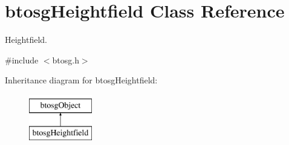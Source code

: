\hypertarget{classbtosgHeightfield}{}\section{btosg\+Heightfield Class Reference}
\label{classbtosgHeightfield}


Heightfield.  




{\ttfamily \#include $<$btosg.\+h$>$}

Inheritance diagram for btosg\+Heightfield\+:\begin{figure}[H]
\begin{center}
\leavevmode
\includegraphics[height=2.000000cm]{classbtosgHeightfield}
\end{center}
\end{figure}
